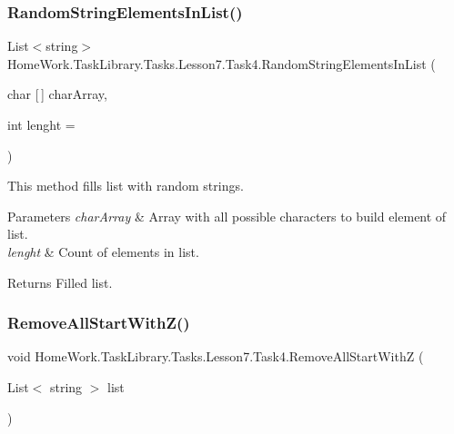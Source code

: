 \subsubsection{\texorpdfstring{RandomStringElementsInList()}{RandomStringElementsInList()}}
{\footnotesize\ttfamily List$<$string$>$ Home\+Work.\+Task\+Library.\+Tasks.\+Lesson7.\+Task4.\+Random\+String\+Elements\+In\+List (\begin{DoxyParamCaption}\item[{char \mbox{[}$\,$\mbox{]}}]{char\+Array,  }\item[{int}]{lenght = {} }\end{DoxyParamCaption})\hspace{0.3cm}{\ttfamily [private]}}



This method fills list with random strings. 


\begin{DoxyParams}{Parameters}
{\em char\+Array} & Array with all possible characters to build element of list.\\
\hline
{\em lenght} & Count of elements in list.\\
\hline
\end{DoxyParams}
\begin{DoxyReturn}{Returns}
Filled list.
\end{DoxyReturn}
\mbox{\label{class_home_work_1_1_task_library_1_1_tasks_1_1_lesson7_1_1_task4_a7708d136ddb289d7d4ad178d1b794e68}} 
\subsubsection{\texorpdfstring{RemoveAllStartWithZ()}{RemoveAllStartWithZ()}}
{\footnotesize\ttfamily void Home\+Work.\+Task\+Library.\+Tasks.\+Lesson7.\+Task4.\+Remove\+All\+Start\+WithZ (\begin{DoxyParamCaption}\item[{List$<$ string $>$}]{list }\end{DoxyParamCaption})\hspace{0.3cm}{\ttfamily [private]}}



